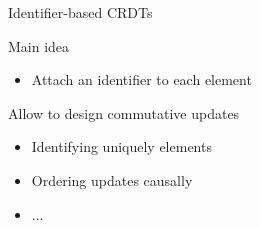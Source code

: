 \documentclass[10pt]{beamer}
\begin{document}










\begin{frame}{Identifier-based \acp{CRDT}}
  \begin{block}{Main idea}
    \begin{itemize}
      \item Attach an identifier to each element
    \end{itemize}
  \end{block}

  \bigskip

  \begin{block}{Allow to design commutative updates}
    \begin{itemize}
      \item Identifying uniquely elements
      \item Ordering updates causally
      \item ...
    \end{itemize}
  \end{block}
\end{frame}
\end{document}
